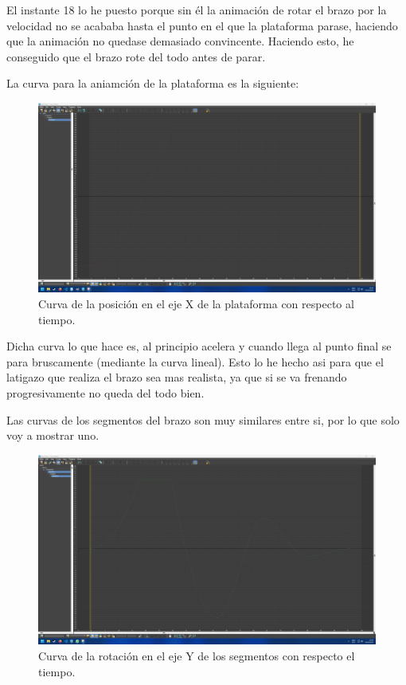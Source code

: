 \documentclass{article}
\begin{document}
El instante 18 lo he puesto porque sin él la animación de rotar el brazo por la velocidad no se acababa hasta el punto en el que la plataforma parase, haciendo que la animación no quedase demasiado convincente. Haciendo esto, he conseguido que el brazo rote del todo antes de parar.

La curva para la aniamción de la plataforma es la siguiente:

\begin{figure}[H]
    \centering
    \includegraphics[width=\textwidth]{imagenes/Ejercicio4/curvas/base/red.png}
    \caption{Curva de la posición en el eje X de la plataforma con respecto al tiempo.}
\end{figure}


Dicha curva lo que hace es, al principio acelera y cuando llega al punto final se para bruscamente (mediante la curva lineal). Esto lo he hecho asi para que el latigazo que realiza el brazo sea mas realista, ya que si se va frenando progresivamente no queda del todo bien.

Las curvas de los segmentos del brazo son muy similares entre si, por lo que solo voy a mostrar uno.

\begin{figure}[H]
    \centering
    \includegraphics[width=\textwidth]{imagenes/Ejercicio4/curvas/segmentos/green.png}
    \caption{Curva de la rotación en el eje Y de los segmentos con respecto el tiempo.}
\end{figure}
\end{document}
